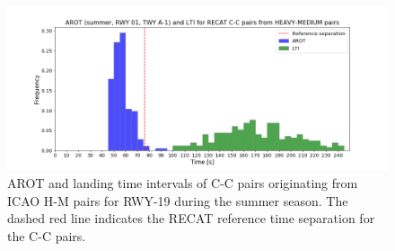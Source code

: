 \begin{table}[h]
\centering
{}
\caption[RECAT-EU time-based separation minima]{RECAT-EU WT time-based separation minima on approach and departure~\cite{rooseleer2015recat}}
\label{tab:RECAT-time}
\end{table}



\begin{figure}[h]
    \centering
    \includegraphics[width=1.0\textwidth]{graphics/fig_best_CC_from_HM_pairs_time_sep.png}
    \caption[AROT and LTI of C-C pairs from ICAO H-M pairs on RWY~19]{AROT and landing time intervals of C-C pairs originating from ICAO H-M pairs for RWY-19 during the summer season. The dashed red line indicates the RECAT reference time separation for the C-C pairs.}
    \label{fig:best_CC_from_HM_pairs_time_sep}
\end{figure}


